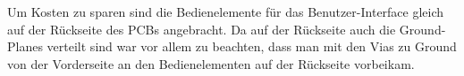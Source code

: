 Um Kosten zu sparen sind die Bedienelemente für das Benutzer-Interface gleich auf der Rückseite des PCBs angebracht. Da auf der Rückseite auch die Ground-Planes verteilt sind war vor allem zu beachten, dass man mit den Vias zu Ground von der Vorderseite an den Bedienelementen auf der Rückseite vorbeikam.